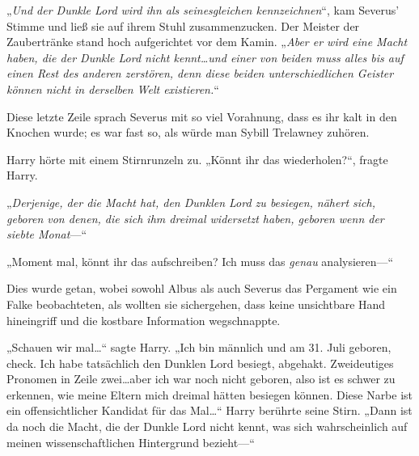 „\emph{Und der Dunkle Lord wird ihn als seinesgleichen kennzeichnen}“, kam Severus' Stimme und ließ sie auf ihrem Stuhl zusammenzucken. Der Meister der Zaubertränke stand hoch aufgerichtet vor dem Kamin. „\emph{Aber er wird eine Macht haben, die der Dunkle Lord nicht kennt…und einer von beiden muss alles bis auf einen Rest des anderen zerstören, denn diese beiden unterschiedlichen Geister können nicht in derselben Welt existieren.}“

Diese letzte Zeile sprach Severus mit so viel Vorahnung, dass es ihr kalt in den Knochen wurde; es war fast so, als würde man Sybill Trelawney zuhören.

Harry hörte mit einem Stirnrunzeln zu. „Könnt ihr das wiederholen?“, fragte Harry.

„\emph{Derjenige, der die Macht hat, den Dunklen Lord zu besiegen, nähert sich, geboren von denen, die sich ihm dreimal widersetzt haben, geboren wenn der siebte Monat}—“

„Moment mal, könnt ihr das aufschreiben? Ich muss das \emph{genau} analysieren—“

Dies wurde getan, wobei sowohl Albus als auch Severus das Pergament wie ein Falke beobachteten, als wollten sie sichergehen, dass keine unsichtbare Hand hineingriff und die kostbare Information wegschnappte.

„Schauen wir mal…“ sagte Harry. „Ich bin männlich und am 31. Juli geboren, check. Ich habe tatsächlich den Dunklen Lord besiegt, abgehakt. Zweideutiges Pronomen in Zeile zwei…aber ich war noch nicht geboren, also ist es schwer zu erkennen, wie meine Eltern mich dreimal hätten besiegen können. Diese Narbe ist ein offensichtlicher Kandidat für das Mal…“ Harry berührte seine Stirn. „Dann ist da noch die Macht, die der Dunkle Lord nicht kennt, was sich wahrscheinlich auf meinen wissenschaftlichen Hintergrund bezieht—“

